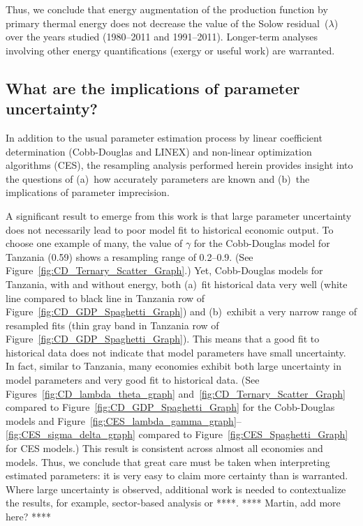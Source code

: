 \documentclass[preprint,authoryear,12pt]{elsarticle}\usepackage[]{graphicx}\usepackage[]{color}
\begin{document}
Thus, we conclude that energy augmentation of the production function 
by primary thermal energy does not decrease the value of the Solow residual~($\lambda$) 
over the years studied (1980--2011 and 1991--2011). 
Longer-term analyses involving other energy quantifications (exergy or useful work) 
are warranted.


\subsection{What are the implications of parameter uncertainty?}
\label{sec:implications}

In addition to the usual parameter estimation process 
by linear coefficient determination (Cobb-Douglas and LINEX) 
and non-linear optimization algorithms (CES), 
the resampling analysis performed herein 
provides insight into the questions of 
(a)~how accurately parameters are known and 
(b)~the implications of parameter imprecision. 

A significant result to emerge from this work is that large parameter uncertainty 
does not necessarily lead to poor model fit to historical economic output. 
To choose one example of many, 
the value of $\gamma$ for the Cobb-Douglas model for Tanzania (0.59) 
shows a resampling range of 0.2--0.9. 
(See Figure~\ref{fig:CD_Ternary_Scatter_Graph}.) 
Yet, Cobb-Douglas models for Tanzania, with and without energy, both 
(a)~fit historical data very well 
(white line compared to black line in Tanzania row of Figure~\ref{fig:CD_GDP_Spaghetti_Graph}) 
and 
(b)~exhibit a very narrow range of resampled fits 
(thin gray band in Tanzania row of Figure~\ref{fig:CD_GDP_Spaghetti_Graph}). 
This means that a good fit to historical data does not indicate 
that model parameters have small uncertainty. 
In fact, similar to Tanzania, 
many economies exhibit both large uncertainty in model parameters and
very good fit to historical data. 
(See Figures~\ref{fig:CD_lambda_theta_graph} and~\ref{fig:CD_Ternary_Scatter_Graph} 
compared to Figure~\ref{fig:CD_GDP_Spaghetti_Graph}
for the Cobb-Douglas models and 
Figure~\ref{fig:CES_lambda_gamma_graph}--\ref{fig:CES_sigma_delta_graph}
compared to Figure~\ref{fig:CES_Spaghetti_Graph} for CES models.) 
This result is consistent across almost all economies and models. 
Thus, we conclude that great care must be taken when interpreting estimated parameters: 
it is very easy to claim more certainty than is warranted. 
Where large uncertainty is observed, 
additional work is needed to contextualize the results, 
for example, 
sector-based analysis or ****. **** Martin, add more here? ****
\end{document}
